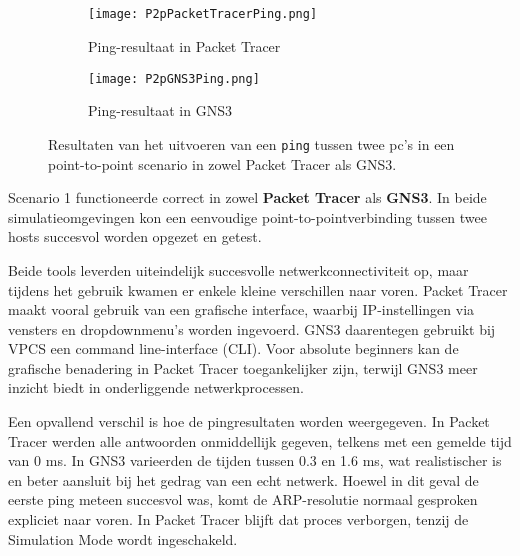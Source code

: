 \subsection{}
\begin{figure}[H]
    \centering
    \begin{subfigure}[b]{0.48\textwidth}
        \centering
        \texttt{[image: P2pPacketTracerPing.png]}
        \caption{Ping-resultaat in Packet Tracer}
        \label{fig:ping_pt}
    \end{subfigure}
    \hfill
    \begin{subfigure}[b]{0.48\textwidth}
        \centering
        \texttt{[image: P2pGNS3Ping.png]}
        \caption{Ping-resultaat in GNS3}
        \label{fig:ping_gns3}
    \end{subfigure}
    \caption[Vergelijking van ping-resultaten tussen Packet Tracer en GNS3]{Resultaten van het uitvoeren van een \texttt{ping} tussen twee pc’s in een point-to-point scenario in zowel Packet Tracer als GNS3.}
    \label{fig:ping_pt_gns3}
\end{figure}

Scenario 1 functioneerde correct in zowel \textbf{Packet Tracer} als \textbf{GNS3}. In beide simulatieomgevingen kon een eenvoudige point-to-pointverbinding tussen twee hosts succesvol worden opgezet en getest.

\vspace{0.3cm}

Beide tools leverden uiteindelijk succesvolle netwerkconnectiviteit op, maar tijdens het gebruik kwamen er enkele kleine verschillen naar voren. Packet Tracer maakt vooral gebruik van een grafische interface, waarbij IP-instellingen via vensters en dropdownmenu’s worden ingevoerd. GNS3 daarentegen gebruikt bij VPCS een command line-interface (CLI). Voor absolute beginners kan de grafische benadering in Packet Tracer toegankelijker zijn, terwijl GNS3 meer inzicht biedt in onderliggende netwerkprocessen.

\vspace{0.3cm}

Een opvallend verschil is hoe de pingresultaten worden weergegeven. In Packet Tracer werden alle antwoorden onmiddellijk gegeven, telkens met een gemelde tijd van 0 ms. In GNS3 varieerden de tijden tussen 0.3 en 1.6 ms, wat realistischer is en beter aansluit bij het gedrag van een echt netwerk. Hoewel in dit geval de eerste ping meteen succesvol was, komt de ARP-resolutie normaal gesproken expliciet naar voren. In Packet Tracer blijft dat proces verborgen, tenzij de Simulation Mode wordt ingeschakeld.


